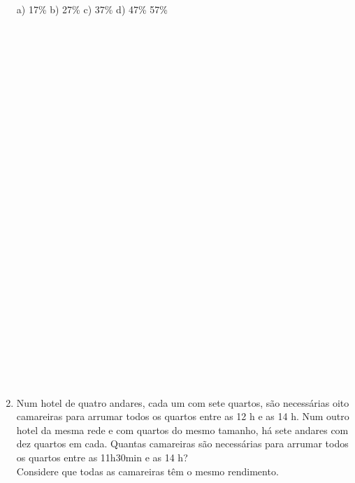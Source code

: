 \documentclass[a4paper,14pt]{article}
\begin{document}
\begin{multicols}{2}
\begin{enumerate}
			a) 17\% b) 27\% c) 37\% d) 47\% 57\% \\\\\\\\\\\\\\\\\\\\\\\\\\\\\\\\\\\\\\\\\\\\\\\\\\\\\\\\
			\item Num hotel de quatro andares, cada um com sete quartos, são necessárias oito camareiras para arrumar todos os quartos entre as 12 h e as 14 h. Num outro hotel da mesma rede e com quartos do mesmo tamanho, há sete andares com dez quartos em cada. Quantas camareiras são necessárias para arrumar todos os quartos entre as 11h30min e as 14 h? \\
			Considere que todas as camareiras têm o mesmo rendimento.  \\\\\\\\\\\\\\\\\\\\\\\\\\\\\\\\\\\\\\\\\\\\\\\\\\\\

\end{enumerate}
\end{multicols}
\end{document}

